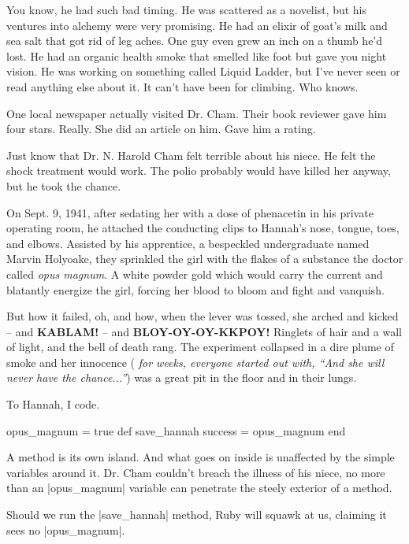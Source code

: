 \documentclass[12pt,twoside]{report}
\begin{document}
You know, he had such bad timing.  He was scattered as a novelist, but
his ventures into alchemy were very promising.  He had an elixir of
goat's milk and sea salt that got rid of leg aches. One guy even grew
an inch on a thumb he'd lost.  He had an organic health smoke that
smelled like foot but gave you night vision.  He was working on
something called Liquid Ladder, but I've never seen or read anything
else about it.  It can't have been for climbing.  Who knows.

One local newspaper actually visited Dr. Cham.  Their book reviewer
gave him four stars. Really.  She did an article on him.  Gave him a
rating.

Just know that Dr. N. Harold Cham felt terrible about his niece.  He
felt the shock treatment would work.  The polio probably would have
killed her anyway, but he took the chance.

On Sept. 9, 1941, after sedating her with a dose of phenacetin in his
private operating room, he attached the conducting clips to Hannah's
nose, tongue, toes, and elbows.  Assisted by his apprentice, a
bespeckled undergraduate named Marvin Holyoake, they sprinkled the
girl with the flakes of a substance the doctor called {\em opus
  magnum}.  A white powder gold which would carry the current and
blatantly energize the girl, forcing her blood to bloom and fight and
vanquish.

But how it failed, oh, and how, when the lever was tossed, she arched
and kicked -- and {\bf KABLAM!} -- and {\bf BLOY-OY-OY-KKPOY!}
Ringlets of hair and a wall of light, and the bell of death rang.  The
experiment collapsed in a dire plume of smoke and her innocence ({\em
  for weeks, everyone started out with, ``And she will never have the
  chance...''}) was a great pit in the floor and in their lungs.

To Hannah, I code.


\begin{rubycode}

 opus_magnum = true
 def save_hannah
   success = opus_magnum
 end

\end{rubycode}


A method is its own island.  And what goes on inside is unaffected by
the simple variables around it. Dr. Cham couldn't breach the illness
of his niece, no more than an \rubyinline|opus_magnum|
variable can penetrate the steely exterior of a method.

Should we run the \rubyinline|save_hannah| method,
Ruby will squawk at us, claiming it sees no
\rubyinline|opus_magnum|.
\end{document}
